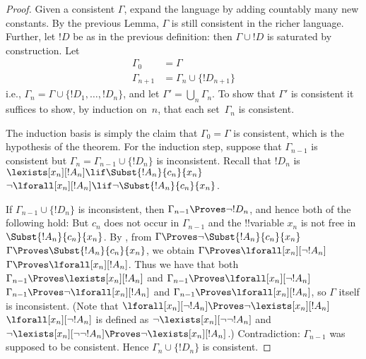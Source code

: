 \documentclass[../../include/open-logic-section]{subfiles}
\begin{document}
\begin{proof}
Given a consistent $\Gamma$, expand the language by adding countably
many new constants. By the previous Lemma, $\Gamma$ is still
consistent in the richer language. Further, let $!D$ be as in the
previous definition: then $\Gamma \cup !D$ is saturated by
construction. Let
\begin{align*}
\Gamma_0 & = \Gamma \\
\Gamma_{n+1} & = \Gamma_n \cup \{!D_{n+1} \}
\end{align*}
i.e., $\Gamma_n = \Gamma \cup \{ !D_1, \dots, !D_n \}$, and let
$\Gamma' = \bigcup_{n} \Gamma_n$.  To show that $\Gamma'$ is
consistent it suffices to show, by induction on~$n$, that each
set~$\Gamma_n$ is consistent.

The induction basis is simply the claim that $\Gamma_0 = \Gamma$ is
consistent, which is the hypothesis of the theorem.
For the induction step, suppose that $\Gamma_{n-1}$ is consistent but
$\Gamma_n = \Gamma_{n-1} \cup \{!D_n\}$ is inconsistent. Recall that
$!D_n$ is
{$\lexists[x_{n}][!A_{n}] \lif \Subst{!A_{n}}{c_{n}}{x_{n}}$}
{$\lnot\lforall[x_{n}][!A_{n}] \lif \lnot \Subst{!A_{n}}{c_{n}}{x_{n}}$}. 

If $\Gamma_{n-1} \cup \{!D_n\}$ is inconsistent, then $\Gamma_{n-1}
\Proves \lnot !D_n$, and hence both of the following hold:
But $c_n$ does not occur in $\Gamma_{n-1}$ and the !!{variable} $x_n$
is not free in $\Subst{!A_n}{c_n}{x_n}$.
By , from 
{$\Gamma \Proves \lnot \Subst{!A_n}{c_n}{x_n}$} 
{$\Gamma \Proves \Subst{!A_n}{c_n}{x_n}$}, 
we obtain 
{$\Gamma \Proves \lforall[x_n][\lnot !A_n]$}
{$\Gamma \Proves \lforall[x_n][!A_n]$}.
Thus we have that both 
{$\Gamma_{n-1} \Proves \lexists[x_n][!A_n]$ and 
$\Gamma_{n-1} \Proves \lforall[x_n][\lnot !A_n]$}
{$\Gamma_{n-1} \Proves \lnot\lforall[x_n][!A_n]$ and 
$\Gamma_{n-1} \Proves \lforall[x_n][!A_n]$},
so $\Gamma$ itself is inconsistent. (Note that
{
{$\lforall[x_n][\lnot !A_n] \Proves
  \lnot\lexists[x_n][!A_n]$}
{$\lforall[x_n][\lnot !A_n]$ is defined as
  $\lnot\lexists[x_n][\lnot\lnot !A_n]$ and
  $\lnot\lexists[x_n][\lnot\lnot !A_n] \Proves
  \lnot\lexists[x_n][!A_n]$}}{}.)
Contradiction: $\Gamma_{n-1}$ was supposed to be consistent. Hence
$\Gamma_n \cup \{ !D_n\}$ is consistent.
\end{proof}
\end{document}
